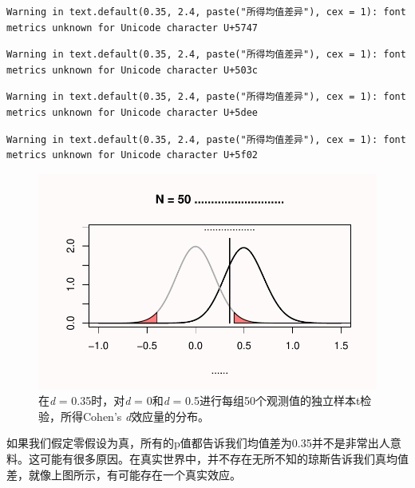 \documentclass[
  letterpaper,
  DIV=11,
  numbers=noendperiod]{scrreprt}
\begin{document}
\begin{verbatim}
Warning in text.default(0.35, 2.4, paste("所得均值差异"), cex = 1): font
metrics unknown for Unicode character U+5747
\end{verbatim}

\begin{verbatim}
Warning in text.default(0.35, 2.4, paste("所得均值差异"), cex = 1): font
metrics unknown for Unicode character U+503c
\end{verbatim}

\begin{verbatim}
Warning in text.default(0.35, 2.4, paste("所得均值差异"), cex = 1): font
metrics unknown for Unicode character U+5dee
\end{verbatim}

\begin{verbatim}
Warning in text.default(0.35, 2.4, paste("所得均值差异"), cex = 1): font
metrics unknown for Unicode character U+5f02
\end{verbatim}

\begin{figure}

{\centering \includegraphics[width=1\textwidth,height=\textheight]{01-pvalue_files/figure-pdf/fig-fig136-1.pdf}

}

\caption{\label{fig-fig136}在\emph{d} = 0.35时，对\emph{d} = 0和\emph{d}
= 0.5进行每组50个观测值的独立样本t检验，所得Cohen's
\emph{d}效应量的分布。}

\end{figure}

如果我们假定零假设为真，所有的p值都告诉我们均值差为0.35并不是非常出人意料。这可能有很多原因。在真实世界中，并不存在无所不知的琼斯告诉我们真均值差，就像上图所示，有可能存在一个真实效应。
\end{document}
